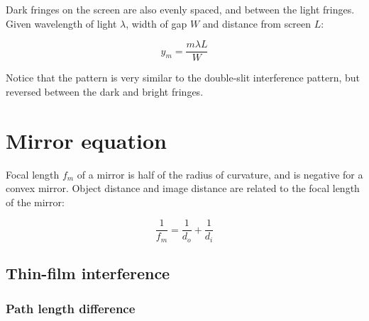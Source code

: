 \documentclass[12pt]{article}
\begin{document}
Dark fringes on the screen are also evenly spaced, and between the light fringes.
Given wavelength of light $\lambda$, width of gap $W$ and distance from screen $L$:

\[
\boxed{
y_m = \frac{m\lambda L}{W}
}
\]

Notice that the pattern is very similar to the double-slit interference pattern, but reversed between the dark and bright fringes.

\section{Mirror equation}

Focal length $f_m$ of a mirror is half of the radius of curvature, and is negative for a convex mirror.
Object distance and image distance are related to the focal length of the mirror:

\[
\boxed{
\frac{1}{f_m} = \frac{1}{d_o} + \frac{1}{d_i}
}
\]

\newpage

\subsection{Thin-film interference}

\begin{center}


\end{center}

\subsubsection{Path length difference}
\end{document}
